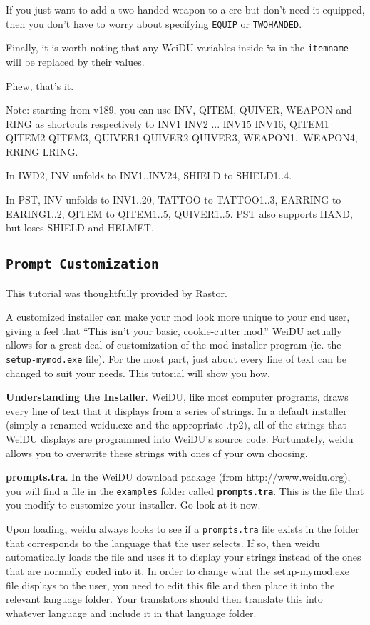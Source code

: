 \documentclass{article}
\def\DEFINE#1{{\tt \bf #1}\label{#1}\index{#1}}
\def\t#1{{\tt #1}}
\begin{document}
If you just want to add a two-handed weapon to a cre but don't need it
equipped, then you don't have to worry about specifying \t{EQUIP} or 
\t{TWOHANDED}.

Finally, it is worth noting that any WeiDU variables inside \t{\%}s in the 
\t{itemname} will be replaced by their values. 

Phew, that's it.

Note: starting from v189, you can use INV, QITEM, QUIVER, WEAPON and RING as
shortcuts respectively
to INV1 INV2 ... INV15 INV16, QITEM1 QITEM2 QITEM3, QUIVER1 QUIVER2 QUIVER3,
WEAPON1...WEAPON4, RRING LRING.

In IWD2, INV unfolds to INV1..INV24, SHIELD to SHIELD1..4.

In PST, INV unfolds to INV1..20, TATTOO to TATTOO1..3, EARRING to EARING1..2,
QITEM to QITEM1..5, QUIVER1..5. PST also supports HAND, but loses SHIELD and
HELMET.

\subsection{\DEFINE{Prompt Customization}}
This tutorial was thoughtfully provided by Rastor.

A customized installer can make your mod look more unique to your end user,
giving a feel that ``This isn't your basic, cookie-cutter mod.''  WeiDU
actually allows for a great deal of customization of the mod installer
program (ie. the \t{setup-mymod.exe} file).  For the most part, just about
every line of text can be changed to suit your needs.  This tutorial will
show you how.

{\bf Understanding the Installer}. 
WeiDU, like most computer programs, draws every line of text that it
displays from a series of strings.  In a default installer (simply a
renamed weidu.exe and the appropriate .tp2), all of the strings that WeiDU
displays are programmed into WeiDU's source code.  Fortunately, weidu
allows you to overwrite these strings with ones of your own choosing.

{\bf prompts.tra}. 
In the WeiDU download package (from http://www.weidu.org), you will find a
file in the \t{examples} folder called \DEFINE{prompts.tra}.  This is the
file that you modify to customize your installer. Go look at it now. 

Upon loading, weidu always looks to see if a \t{prompts.tra} file exists in
the folder that corresponds to the language that the user selects.  If so,
then weidu automatically loads the file and uses it to display your strings
instead of the ones that are normally coded into it.  In order to change
what the setup-mymod.exe file displays to the user, you need to edit this
file and then place it into the relevant language folder.  Your translators
should then translate this into whatever language and include it in that
language folder.
\end{document}
